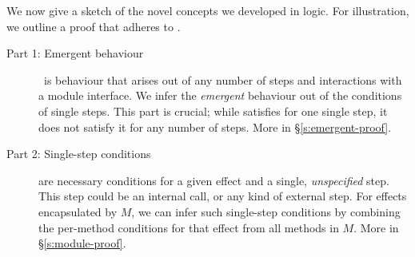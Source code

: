 We now give a sketch of the   novel concepts we developed in  \Nec logic.
For illustration, we  outline  a proof that  \ModC adheres to \SrobustB.
 
\begin{description}

 
\item[Part 1: Emergent behaviour] \ {is behaviour that arises out 
of any number of steps and interactions with a module interface.}
We infer the \emph{emergent} behaviour out of the conditions of  
single steps.
This part is crucial;    while \ModB satisfies  
\SrobustB for one single step, it does not satisfy it for any number of steps. More in \S\ref{s:emergent-proof}.

\vertsp

{}

\vertsp 

 \item[Part 2: Single-step conditions] are
 necessary conditions for a given  effect and
a single, \emph{unspecified} step. This step could be an internal call, or any kind of external step.
    For effects encapsulated by $M$, we can infer such single-step
 conditions by combining the per-method conditions for that effect from 
all   methods in $M$. 
More in \S\ref{s:module-proof}.


\end{description}

